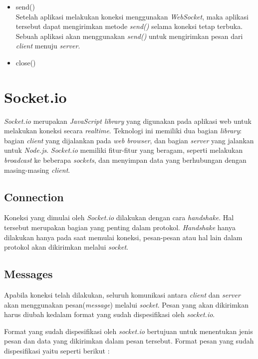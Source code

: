 \begin{itemize}
	\item send() \\
	Setelah aplikasi melakukan koneksi menggunakan \textit{WebSocket}, maka aplikasi tersebut dapat mengirimkan metode \textit{send()} selama koneksi tetap terbuka. Sebuah aplikasi akan menggunakan \textit{send()} untuk mengirimkan pesan dari \textit{client} menuju \textit{server}. 
	
	
	\item close()
	
	
\end{itemize}

\section{Socket.io}
\label{sec:Socket.io}

\textit{Socket.io} merupakan \textit{JavaScript library} yang digunakan pada aplikasi web untuk melakukan koneksi secara \textit{realtime}. Teknologi ini memiliki dua bagian \textit{library}: bagian \textit{client} yang dijalankan pada \textit{web browser}, dan bagian \textit{server} yang jalankan untuk \textit{Node.js}. \textit{Socket.io} memiliki fitur-fitur yang beragam, seperti melakukan \textit{broadcast} ke beberapa \textit{sockets}, dan menyimpan data yang berhubungan dengan masing-masing \textit{client}.

\subsection{Connection}
Koneksi yang dimulai oleh \textit{Socket.io} dilakukan dengan cara \textit{handshake}. Hal tersebut merupakan bagian yang penting dalam protokol. \textit{Handshake} hanya dilakukan hanya pada saat memulai koneksi, pesan-pesan atau hal lain dalam protokol akan dikirimkan melalui \textit{socket}. 


\subsection{Messages}
Apabila koneksi telah dilakukan, seluruh komunikasi antara \textit{client} dan \textit{server} akan menggunakan pesan(\textit{message}) melalui \textit{socket}. Pesan yang akan dikirimkan harus diubah kedalam format yang sudah dispesifikasi oleh \textit{socket.io}.

Format yang sudah dispesifikasi oleh \textit{socket.io} bertujuan untuk menentukan jenis pesan dan data yang dikirimkan dalam pesan tersebut. Format pesan yang sudah dispesifikasi yaitu seperti berikut : 

